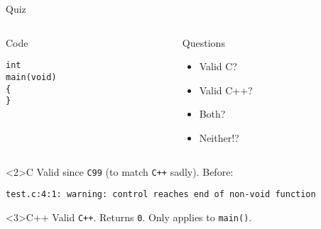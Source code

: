 \documentclass[presentation,aspectratio=169]{beamer}
\begin{document}
\begin{frame}[fragile,label={sec:org23c4234}]{Quiz}
\begin{columns}
\begin{column}{0.48\columnwidth}
\begin{block}{Code}
\begin{verbatim}
int
main(void)
{
}
\end{verbatim}
\end{block}
\end{column}

\begin{column}{0.48\columnwidth}
\begin{block}{Questions}
\begin{itemize}
\item Valid C?
\item Valid C++?
\item Both?
\item Neither!?
\end{itemize}
\end{block}
\end{column}
\end{columns}

\begin{block}<2>{C}
Valid since \texttt{C99} (to match \texttt{C++} sadly). Before:
\begin{verbatim}
test.c:4:1: warning: control reaches end of non-void function
\end{verbatim}
\end{block}

\vspace{-2cm}
\begin{block}<3>{C++}
Valid \texttt{C++}. Returns \texttt{0}. Only applies to \texttt{main()}.
\end{block}
\end{frame}

\end{document}
